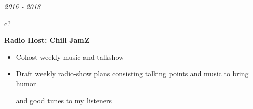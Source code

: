\documentclass[12pt,a4paper,sans]{moderncv} %
\begin{document}
  
\textit{2016 - 2018}
\hspace{2.0 mm}
\begin{tabular}{c?}
 \\
\end{tabular}
 \hspace{2 mm}
 \textbf{Radio Host: Chill JamZ} 
 \vspace{0 mm}
 \begin{itemize}
 \addtolength{\itemindent}{31.7 mm}
 \item{Cohost weekly music and talkshow}
 \item{Draft weekly radio-show plans consisting talking points and music to bring humor 
 
 \hspace{32 mm}and good tunes to my listeners}
 \end{itemize}
 


\end{document}
